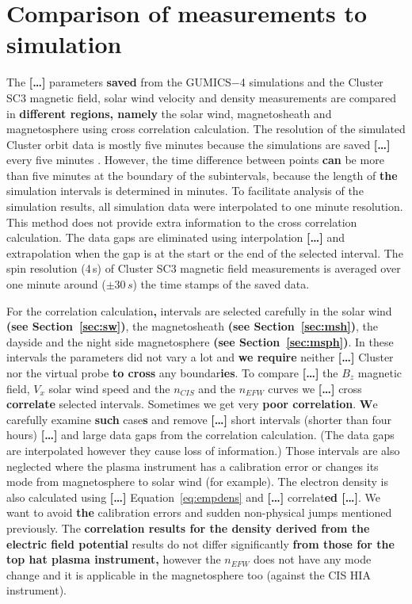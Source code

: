 \documentclass[linenumbers,draft]{agujournal}
\begin{document}
\section{Comparison of measurements to simulation}
\label{sec:comp}

The \textbf{[\dots]} parameters \textbf{saved} from the GUMICS$-$4 simulations and the Cluster SC3 magnetic field, solar wind velocity and density measurements are compared in \textbf{different regions, namely} the solar wind, magnetosheath and magnetosphere using cross correlation calculation. The resolution of the simulated Cluster orbit data is mostly five minutes because the simulations are saved \textbf{[\dots]} every five minutes \citep{facsko16:_one_earth}. However, the time difference between points \textbf{can} be more than five minutes at the boundary of the subintervals, because the length of \textbf{the} simulation intervals is determined in minutes. To facilitate analysis of the simulation results, all simulation data were interpolated to one minute resolution. This method does not provide extra information to the cross correlation calculation. The data gaps are eliminated using interpolation \textbf{[\dots]} and extrapolation when the gap is at the start or the end of the selected interval. The spin resolution (4\,s) of Cluster SC3 magnetic field measurements is averaged over one minute around ($\pm30\,s$) the time stamps of the saved data. 

For the correlation calculation\textbf{,} intervals are selected carefully in the solar wind \textbf{(see Section~\ref{sec:sw})}, the magnetosheath \textbf{(see Section~\ref{sec:msh})}, the dayside and the night side magnetosphere \textbf{(see Section~\ref{sec:msph})}. In these intervals the parameters did not vary a lot and \textbf{we require} neither \textbf{[\dots]} Cluster nor the virtual probe \textbf{to cross} any boundar\textbf{ies}. To compare \textbf{[\dots]} the $B_z$ magnetic field, $V_x$ solar wind speed and the $n_{CIS}$ and the $n_{EFW}$ curves we \textbf{[\dots]} cross \textbf{correlate} selected intervals. Sometimes we get very \textbf{poor correlation}. \textbf{W}e carefully examine \textbf{such} case\textbf{s} and remove \textbf{[\dots]} short intervals (shorter than four hours) \textbf{[\dots]} and large data gaps from the correlation calculation. (The data gaps are interpolated however they cause loss of information.) Those intervals are also neglected where the plasma instrument has a calibration error or changes its mode from magnetosphere to solar wind (for example). The electron density is also calculated using \textbf{[\dots]} Equation~\ref{eq:empdens} and \textbf{[\dots]} correlat\textbf{ed [\dots]}. We want to avoid \textbf{the} calibration errors and sudden non-physical jumps mentioned previously. The \textbf{correlation results for the density derived from the electric field potential} results do not differ significantly \textbf{from those for the top hat plasma instrument,} however the $n_{EFW}$ does not have any mode change and it is applicable in the magnetosphere too (against the CIS HIA instrument).
\end{document}
